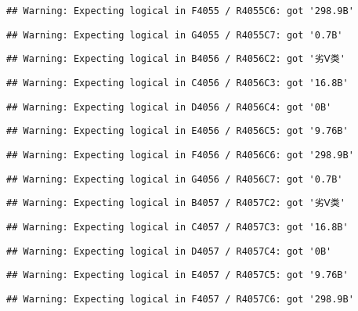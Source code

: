 \documentclass[
]{article}
\begin{document}
\begin{verbatim}
## Warning: Expecting logical in F4055 / R4055C6: got '298.9B'
\end{verbatim}

\begin{verbatim}
## Warning: Expecting logical in G4055 / R4055C7: got '0.7B'
\end{verbatim}

\begin{verbatim}
## Warning: Expecting logical in B4056 / R4056C2: got '劣Ⅴ类'
\end{verbatim}

\begin{verbatim}
## Warning: Expecting logical in C4056 / R4056C3: got '16.8B'
\end{verbatim}

\begin{verbatim}
## Warning: Expecting logical in D4056 / R4056C4: got '0B'
\end{verbatim}

\begin{verbatim}
## Warning: Expecting logical in E4056 / R4056C5: got '9.76B'
\end{verbatim}

\begin{verbatim}
## Warning: Expecting logical in F4056 / R4056C6: got '298.9B'
\end{verbatim}

\begin{verbatim}
## Warning: Expecting logical in G4056 / R4056C7: got '0.7B'
\end{verbatim}

\begin{verbatim}
## Warning: Expecting logical in B4057 / R4057C2: got '劣Ⅴ类'
\end{verbatim}

\begin{verbatim}
## Warning: Expecting logical in C4057 / R4057C3: got '16.8B'
\end{verbatim}

\begin{verbatim}
## Warning: Expecting logical in D4057 / R4057C4: got '0B'
\end{verbatim}

\begin{verbatim}
## Warning: Expecting logical in E4057 / R4057C5: got '9.76B'
\end{verbatim}

\begin{verbatim}
## Warning: Expecting logical in F4057 / R4057C6: got '298.9B'
\end{verbatim}
\end{document}

